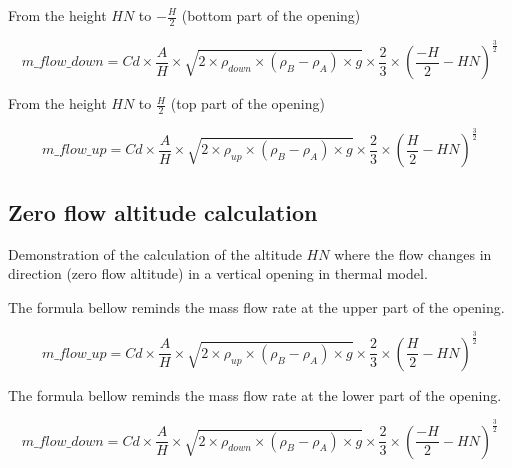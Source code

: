 \documentclass[a4paper, english]{article}
\begin{document}
            From the height $ HN $ to  $ - \frac{H}{2} $  (bottom part of the opening)
            
            \begin{equation} 
            \label{eq9}
                m\_flow\_down = Cd \times \frac{A}{H} \times \sqrt{ 2 \times \rho_{down} \times ( \rho_B - \rho_A ) \times g } \times \frac{2}{3} \times {\left( \frac{-H}{2} - HN \right)}^\frac{3}{2}
            \end{equation} 
            
            From the height $ HN $ to $ \frac{H}{2} $  (top part of the opening)
            
            \begin{equation} 
            \label{eq10}
                m\_flow\_up = Cd \times \frac{A}{H} \times \sqrt{ 2 \times \rho_{up} \times ( \rho_B - \rho_A ) \times g } \times \frac{2}{3} \times {\left( \frac{H}{2} - HN \right)}^\frac{3}{2}
            \end{equation} 
        
    
        \subsection{Zero flow altitude calculation}
    
			Demonstration of the calculation of the altitude $ HN $ where the flow changes in direction (zero flow altitude) in a vertical opening in thermal model.
            
            The formula bellow reminds the mass flow rate at the upper part of the opening.
            
            \begin{equation*}
                m\_flow\_up = Cd \times \frac{A}{H} \times \sqrt{ 2 \times \rho_{up} \times ( \rho_B - \rho_A ) \times g } \times \frac{2}{3} \times {\left( \frac{H}{2} - HN \right)}^\frac{3}{2}
            \end{equation*}

            The formula bellow reminds the mass flow rate at the lower part of the opening.

            \begin{equation*}
                \label{eq12}
                m\_flow\_down = Cd \times \frac{A}{H} \times \sqrt{ 2 \times \rho_{down} \times ( \rho_B - \rho_A ) \times g } \times \frac{2}{3} \times {\left( \frac{-H}{2} - HN \right)}^\frac{3}{2}
            \end{equation*}
            
\end{document}
